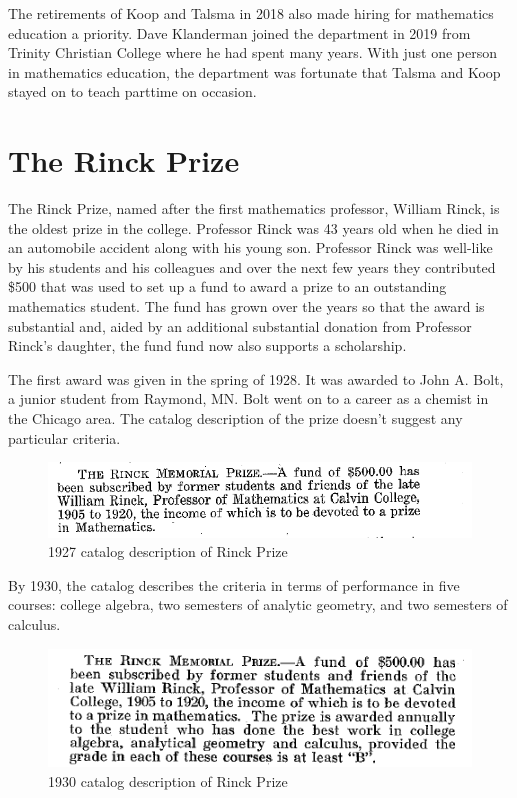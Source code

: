 \documentclass[
]{book}
\begin{document}
The retirements of Koop and Talsma in 2018 also made hiring for mathematics education a priority. Dave Klanderman joined the department in 2019 from Trinity Christian College where he had spent many years. With just one person in mathematics education, the department was fortunate that Talsma and Koop stayed on to teach parttime on occasion.

\hypertarget{the-rinck-prize}{%
\chapter{The Rinck Prize}\label{the-rinck-prize}}

The Rinck Prize, named after the first mathematics professor, William Rinck, is the oldest prize in the college. Professor Rinck was 43 years old when he died in an automobile accident along with his young son. Professor Rinck was well-like by his students and his colleagues and over the next few years they contributed \$500 that was used to set up a fund to award a prize to an outstanding mathematics student. The fund has grown over the years so that the award is substantial and, aided by an additional substantial donation from Professor Rinck's daughter, the fund fund now also supports a scholarship.

The first award was given in the spring of 1928. It was awarded to John A. Bolt, a junior student from Raymond, MN. Bolt went on to a career as a chemist in the Chicago area. The catalog description of the prize doesn't suggest any particular criteria.

\begin{figure}

{\centering \includegraphics[width=0.7\linewidth]{images/Rinck1927} 

}

\caption{1927 catalog description of Rinck Prize}\label{fig:Rinck}
\end{figure}

By 1930, the catalog describes the criteria in terms of performance in five courses: college algebra, two semesters of analytic geometry, and two semesters of calculus.

\begin{figure}

{\centering \includegraphics[width=0.7\linewidth]{images/Rinck1930} 

}

\caption{1930 catalog description of Rinck Prize}\label{fig:Rinck30}
\end{figure}
\end{document}
